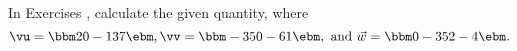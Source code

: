 {\noin In Exercises }
{, calculate the given quantity, where
\[
\vu = \bbm 2\\0\\-1\\3\\7\ebm, \vv = \bbm -3\\5\\0\\-6\\1\ebm, \text{ and } \vec w = \bbm 0\\-3\\5\\2\\-4\ebm.
\]}
